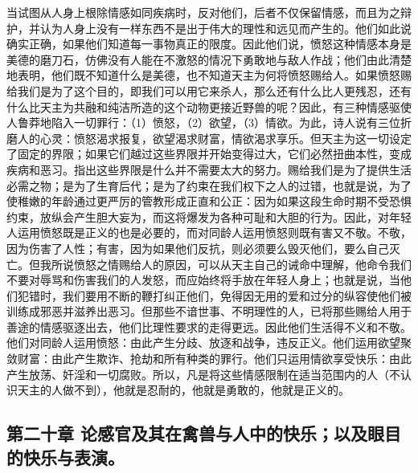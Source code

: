 当试图从人身上根除情感如同疾病时，反对他们，后者不仅保留情感，而且为之辩护，并认为人身上没有一样东西不是出于伟大的理性和远见而产生的。他们如此说确实正确，如果他们知道每一事物真正的限度。因此他们说，愤怒这种情感本身是美德的磨刀石，仿佛没有人能在不激怒的情况下勇敢地与敌人作战；他们由此清楚地表明，他们既不知道什么是美德，也不知道天主为何将愤怒赐给人。如果愤怒赐给我们是为了这个目的，即我们可以用它来杀人，那么还有什么比人更残忍，还有什么比天主为共融和纯洁所造的这个动物更接近野兽的呢？因此，有三种情感驱使人鲁莽地陷入一切罪行：（1）愤怒，（2）欲望，（3）情欲。为此，诗人说有三位折磨人的心灵：愤怒渴求报复，欲望渴求财富，情欲渴求享乐。但天主为这一切设定了固定的界限；如果它们越过这些界限并开始变得过大，它们必然扭曲本性，变成疾病和恶习。指出这些界限是什么并不需要太大的努力。赐给我们是为了提供生活必需之物；是为了生育后代；是为了约束在我们权下之人的过错，也就是说，为了使稚嫩的年龄通过更严厉的管教形成正直和公正：因为如果这段生命时期不受恐惧约束，放纵会产生胆大妄为，而这将爆发为各种可耻和大胆的行为。因此，对年轻人运用愤怒既是正义的也是必要的，而对同龄人运用愤怒则既有害又不敬。不敬，因为伤害了人性；有害，因为如果他们反抗，则必须要么毁灭他们，要么自己灭亡。但我所说愤怒之情赐给人的原因，可以从天主自己的诫命中理解，他命令我们不要对辱骂和伤害我们的人发怒，而应始终将手放在年轻人身上；也就是说，当他们犯错时，我们要用不断的鞭打纠正他们，免得因无用的爱和过分的纵容使他们被训练成邪恶并滋养出恶习。但那些不谙世事、不明理性的人，已将那些赐给人用于善途的情感驱逐出去，他们比理性要求的走得更远。因此他们生活得不义和不敬。他们对同龄人运用愤怒：由此产生分歧、放逐和战争，违反正义。他们运用欲望聚敛财富：由此产生欺诈、抢劫和所有种类的罪行。他们只运用情欲享受快乐：由此产生放荡、奸淫和一切腐败。所以，凡是将这些情感限制在适当范围内的人（不认识天主的人做不到），他就是忍耐的，他就是勇敢的，他就是正义的。\par


\subsection{第二十章 论感官及其在禽兽与人中的快乐；以及眼目的快乐与表演。}

